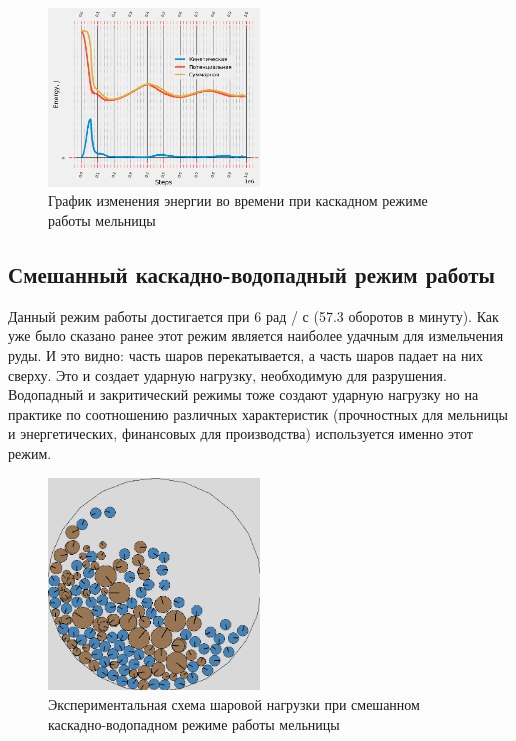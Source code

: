 \documentclass[utf8x, 14pt, oneside, a4paper]{article}
\begin{document}
\begin{figure}[H]
	\centering
	\includegraphics[width=0.5\textwidth]{kaskad_energy}
	\caption{График изменения энергии во времени при каскадном режиме работы мельницы}
	\label{pic:kaskad_energy}
\end{figure} 

\subsection{Смешанный каскадно-водопадный режим работы}

Данный режим работы достигается при 6 рад / с (57.3 оборотов в минуту).
Как уже было сказано ранее этот режим является наиболее удачным для измельчения руды.
И это видно: часть шаров перекатывается, а часть шаров падает на них сверху.
Это и создает ударную нагрузку, необходимую для разрушения.
Водопадный и закритический режимы тоже создают ударную нагрузку но на практике по соотношению различных характеристик (прочностных для мельницы и энергетических, финансовых для производства) используется именно этот режим.

\begin{figure}[H]
	\centering
	\includegraphics[width=0.5\textwidth]{smeshan_result} 
	\caption{Экспериментальная схема шаровой нагрузки при смешанном каскадно-водопадном режиме работы мельницы}
	\label{pic:smeshan_result}
\end{figure} 
\end{document}
